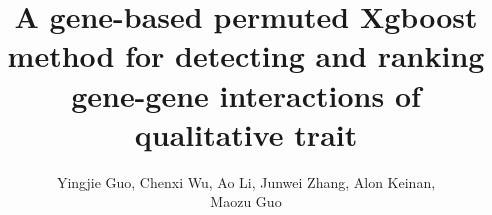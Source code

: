 \documentclass[11pt]{article}
\author{Yingjie Guo, Chenxi Wu, Ao Li, Junwei Zhang, Alon Keinan,\\ Maozu Guo}
\title{A gene-based permuted Xgboost method for detecting and ranking gene-gene interactions of qualitative trait}
\theoremstyle{plain}
\theoremstyle{definition}
\theoremstyle{remark}
\begin{document}
\begin{thebibliography}{9}
\end{thebibliography}
\end{document}
